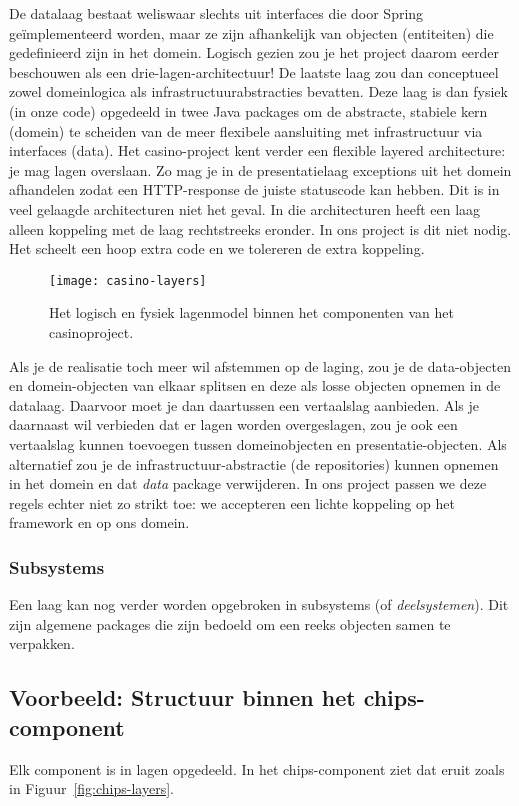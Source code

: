 De datalaag bestaat weliswaar slechts uit interfaces die door 
Spring geïmplementeerd worden, maar ze zijn afhankelijk van objecten (entiteiten) die
gedefinieerd zijn in het domein. Logisch gezien zou je het project daarom 
eerder beschouwen als een drie-lagen-architectuur! De laatste laag zou dan 
conceptueel zowel domeinlogica als infrastructuurabstracties bevatten. 
Deze laag is dan fysiek (in onze code) opgedeeld in twee Java packages 
om de abstracte, stabiele kern (domein) te scheiden van de meer flexibele 
aansluiting met infrastructuur via interfaces (data). 
Het casino-project kent verder een flexible layered architecture: 
je mag lagen overslaan.
Zo mag je in de presentatielaag exceptions uit het domein
afhandelen zodat een HTTP-response de juiste statuscode kan hebben.
Dit is in veel gelaagde architecturen niet het geval. In die architecturen 
heeft een laag alleen koppeling met de laag rechtstreeks eronder.
In ons project is dit niet nodig. Het scheelt een hoop extra code en we 
tolereren de extra koppeling.

\begin{figure}[H]
    \centering
    \texttt{[image: casino-layers]}
    \caption{Het logisch en fysiek lagenmodel binnen het componenten van het casinoproject.}
    \label{fig:casino-layers}
\end{figure}

Als je de realisatie toch meer wil afstemmen op de laging, zou je de 
data-objecten en domein-objecten van elkaar splitsen en deze als losse objecten opnemen in de datalaag.
Daarvoor moet je dan daartussen een vertaalslag aanbieden. 
Als je daarnaast wil verbieden dat er lagen worden overgeslagen, 
zou je ook een vertaalslag kunnen toevoegen tussen domeinobjecten en presentatie-objecten.
Als alternatief zou je de infrastructuur-abstractie
(de repositories) kunnen opnemen in het domein en dat \textit{data} package verwijderen.
In ons project passen we deze regels echter niet zo strikt toe:
we accepteren een lichte koppeling op het framework en op ons domein.

\subsubsection{Subsystems}
Een laag kan nog verder worden opgebroken in subsystems (of \textit{deelsystemen}).
Dit zijn algemene packages die zijn bedoeld om een reeks objecten samen te verpakken.

\subsection{Voorbeeld: Structuur binnen het chips-component}
Elk component is in lagen opgedeeld. In het chips-component ziet 
dat eruit zoals in Figuur~\ref{fig:chips-layers}.

